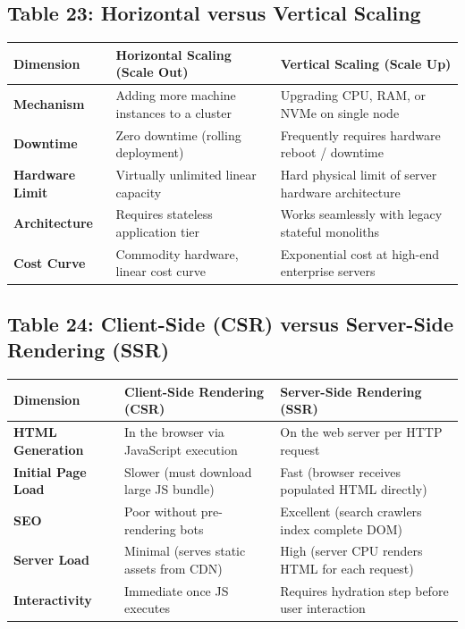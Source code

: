 \subsection*{Table 23: Horizontal versus Vertical Scaling}
\begin{center}
\small
\begin{tabularx}{\textwidth}{lXX}
\toprule
\textbf{Dimension} & \textbf{Horizontal Scaling (Scale Out)} & \textbf{Vertical Scaling (Scale Up)} \\
\midrule
\textbf{Mechanism} & Adding more machine instances to a cluster & Upgrading CPU, RAM, or NVMe on single node \\
\textbf{Downtime} & Zero downtime (rolling deployment) & Frequently requires hardware reboot / downtime \\
\textbf{Hardware Limit} & Virtually unlimited linear capacity & Hard physical limit of server hardware architecture \\
\textbf{Architecture} & Requires stateless application tier & Works seamlessly with legacy stateful monoliths \\
\textbf{Cost Curve} & Commodity hardware, linear cost curve & Exponential cost at high-end enterprise servers \\
\bottomrule
\end{tabularx}
\end{center}

\subsection*{Table 24: Client-Side (CSR) versus Server-Side Rendering (SSR)}
\begin{center}
\small
\begin{tabularx}{\textwidth}{lXX}
\toprule
\textbf{Dimension} & \textbf{Client-Side Rendering (CSR)} & \textbf{Server-Side Rendering (SSR)} \\
\midrule
\textbf{HTML Generation} & In the browser via JavaScript execution & On the web server per HTTP request \\
\textbf{Initial Page Load} & Slower (must download large JS bundle) & Fast (browser receives populated HTML directly) \\
\textbf{SEO} & Poor without pre-rendering bots & Excellent (search crawlers index complete DOM) \\
\textbf{Server Load} & Minimal (serves static assets from CDN) & High (server CPU renders HTML for each request) \\
\textbf{Interactivity} & Immediate once JS executes & Requires hydration step before user interaction \\
\bottomrule
\end{tabularx}
\end{center}

